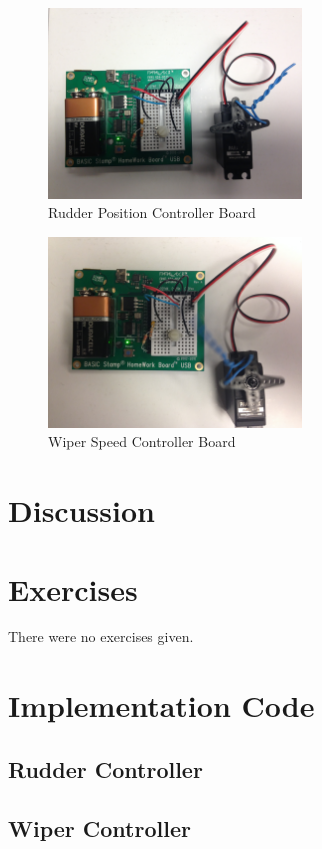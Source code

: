 \documentclass[11pt]{article}
\begin{document}
\begin{figure}
\centering
\includegraphics[width=0.6\textwidth]{rudder-controller.jpg}
\caption{Rudder Position Controller Board}
\label{rudder-controller}
\end{figure}

\begin{figure}
\centering
\includegraphics[width=0.6\textwidth]{wiper-controller.jpg}
\caption{Wiper Speed Controller Board}
\label{wiper-controller}
\end{figure}

\section{Discussion}

\section{Exercises}

There were no exercises given.

\clearpage
\section{Implementation Code}

\subsection{Rudder Controller}
\begingroup
\fontsize{11pt}{13pt}



\endgroup

\clearpage
\subsection{Wiper Controller}
\begingroup
\fontsize{9pt}{10pt}



\endgroup
\end{document}
